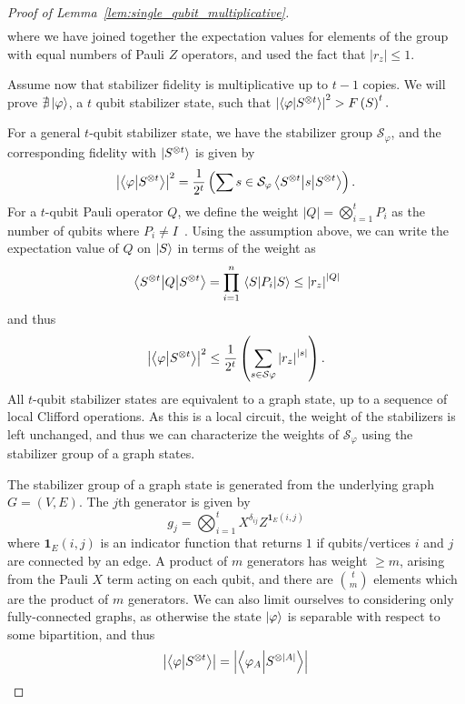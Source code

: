 \begin{proof}[Proof of Lemma~\ref{lem:single_qubit_multiplicative}]
\begin{align}
\label{eq:t_copy_fidelity}
\end{align}
where we have joined together the expectation values for elements of the group with equal numbers of Pauli $Z$ operators, and used the fact that $\left|r_{z}\right|\leq 1$.\par
Assume now that stabilizer fidelity is multiplicative up to $t-1$ copies. We will prove $\nexists \ket{\varphi}$, a $t$ qubit stabilizer state, such that $\left|\braket{\varphi}{S^{\otimes t}}\right|^{2}> F\left(S\right)^{t}.$\par
For a general $t$-qubit stabilizer state, we have the stabilizer group $\mathcal{S}_{\varphi}$, and the corresponding fidelity with $\ket{S^{\otimes t}}$ is given by
\[\left|\braket{\varphi}{S^{\otimes t}}\right|^{2} = \frac{1}{2^{t}} \left( \sum{s\in\mathcal{S}_{\varphi}}\matrixel{S^{\otimes t}}{s}{S^{\otimes t}} \right).\]
For a $t$-qubit Pauli operator $Q$, we define the weight $\left|Q\right|=\bigotimes_{i=1}^{t}P_{i}$ as the number of qubits where $P_{i}\neq I$~\cite{Gottesman1997}. Using the assumption above, we can write the expectation value of $Q$ on $\ket{S}$ in terms of the weight as
\[\matrixel{S^{\otimes t}}{Q}{S^{\otimes t}} = \prod_{i=1}^{n}\matrixel{S}{P_{i}}{S}\leq \left|r_{z}\right|^{\left|Q\right|}\]
and thus
\[
\left|\braket{\varphi}{S^{\otimes t}}\right|^{2} \leq \frac{1}{2^{t}} \left( \sum_{s\in\mathcal{S}{\varphi}} \left|r_{z}\right|^{\left|s\right|}\right).\]
All $t$-qubit stabilizer states are equivalent to a graph state, up to a sequence of local Clifford operations. As this is a local circuit, the weight of the stabilizers is left unchanged, and thus we can characterize the weights of $\mathcal{S}_{\varphi}$ using the stabilizer group of a graph states.\par
The stabilizer group of a graph state is generated from the underlying graph $G=\left(V,E\right)$. The $j$th generator is given by
\[g_{j} = \bigotimes_{i=1}^{t}X^{\delta_{ij}} Z^{\mathbf{1}_{E}\left(i,j\right)}\]
where $\mathbf{1}_{E}\left(i,j\right)$ is an indicator function that returns $1$ if qubits/vertices $i$ and $j$ are connected by an edge. A product of $m$ generators has weight $\geq m$, arising from the Pauli $X$ term acting on each qubit, and there are $\binom{t}{m}$ elements which are the product of $m$ generators. We can also limit ourselves to considering only fully-connected graphs, as otherwise the state $\ket{\varphi}$ is separable with respect to some bipartition, and thus 
\[
\left|\braket{\varphi}{S^{\otimes t}}\right|
=\left|\braket{\varphi_{A}}{S^{\otimes \left|A\right|}}\right|
\]
\end{proof}

